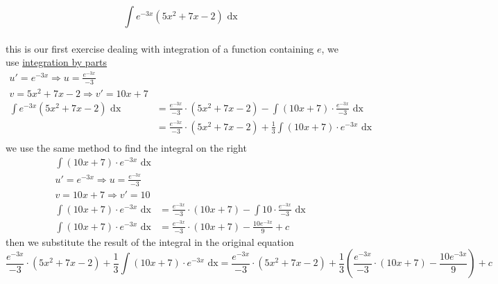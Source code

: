 \documentclass[a4paper,12pt]{article}
\newcommand{\?}{\stackrel{?}{=}}
\begin{document}
\begin{definition}
\begin{my_example}
\[
  \int e^{-3x}(5x^2+7x-2) \text{ dx}
\]\\[0pt]
this is our first exercise dealing with integration of a function containing \(e\), we use \hyperref[sec:org97eb449]{integration by parts}\\[0pt]
\begin{align*}
  u' = e^{-3x} \Rightarrow u = \frac{e^{-3x}}{-3}\\
  v = 5x^2+7x-2 \Rightarrow v' = 10x + 7\\
  \int e^{-3x}(5x^2+7x-2) \text{ dx} &= \frac{e^{-3x}}{-3} \cdot (5x^2+7x-2) - \int (10x + 7) \cdot \frac{e^{-3x}}{-3} \text{ dx}\\
  &= \frac{e^{-3x}}{-3} \cdot (5x^2+7x-2) + \frac13 \int (10x + 7) \cdot e^{-3x} \text{ dx}\\
\end{align*}
we use the same method to find the integral on the right\\[0pt]
\begin{align*}
  \int (10x + 7) \cdot e^{-3x} \text{ dx}\\
  u' = e^{-3x} \Rightarrow u = \frac{e^{-3x}}{-3}\\
  v = 10x + 7 \Rightarrow v' = 10\\
  \int (10x + 7) \cdot e^{-3x} \text{ dx} &= \frac{e^{-3x}}{-3} \cdot (10x + 7) - \int 10 \cdot \frac{e^{-3x}}{-3} \text{ dx}\\
  \int (10x + 7) \cdot e^{-3x} \text{ dx} &= \frac{e^{-3x}}{-3} \cdot (10x + 7) - \frac{10e^{-3x}}{9} + c
\end{align*}
then we substitute the result of the integral in the original equation\\[0pt]
\[
  \frac{e^{-3x}}{-3} \cdot (5x^2+7x-2) + \frac13 \int (10x + 7) \cdot e^{-3x} \text{ dx} = \frac{e^{-3x}}{-3} \cdot (5x^2+7x-2) + \frac13\left(\frac{e^{-3x}}{-3} \cdot (10x + 7) - \frac{10e^{-3x}}{9}\right) + c
\]\\[0pt]
\end{my_example}


\end{definition}
\end{document}
